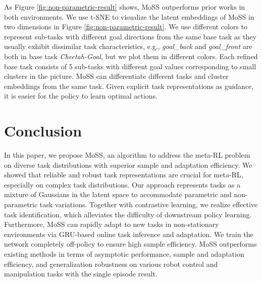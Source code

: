 \documentclass[letterpaper]{article} %
\begin{document}
As Figure \ref{fig:non-parametric-result} shows, MoSS outperforms prior works in both environments. We use t-SNE \cite{t-sne} to visualize the latent embeddings of MoSS in two dimensions in Figure \ref{fig:non-parametric-result}. We use different colors to represent sub-tasks with different goal directions from the same base task as they usually exhibit dissimilar task characteristics, e.g., \textit{goal\_back} and \textit{goal\_front} are both in base task \textit{Cheetah-Goal}, but we plot them in different colors.  Each refined base task consists of 5 sub-tasks with different goal values corresponding to small clusters in the picture. MoSS can differentiate different tasks and cluster embeddings from the same task. Given explicit task representations as guidance, it is easier for the policy to learn optimal actions.






\section{Conclusion}
In this paper, we propose MoSS, an algorithm to address the meta-RL problem on diverse task distributions with superior sample and adaptation efficiency. We showed that reliable and robust task representations are crucial for meta-RL, especially on complex task distributions. Our approach represents tasks as a mixture of Gaussians in the latent space to accommodate parametric and non-parametric task variations. Together with contrastive learning, we realize effective task identification, which alleviates the difficulty of downstream policy learning. Furthermore, MoSS can rapidly adapt to new tasks in non-stationary environments via GRU-based online task inference and adaptation. We train the network completely off-policy to ensure high sample efficiency. MoSS outperforms existing methods in terms of asymptotic performance, sample and adaptation efficiency, and generalization robustness on various robot control and manipulation tasks with the single episode result. 
\end{document}
